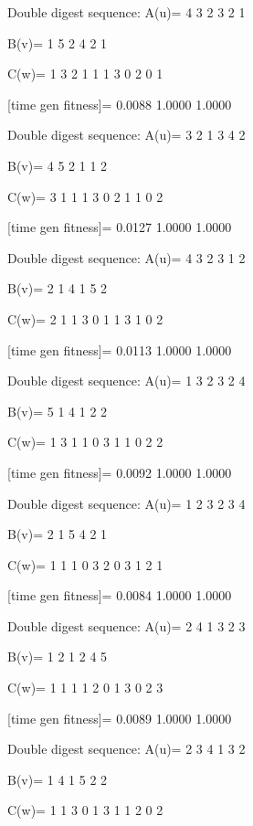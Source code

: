 Double digest sequence:
A(u)=
     4     3     2     3     2     1

B(v)=
     1     5     2     4     2     1

C(w)=
     1     3     2     1     1     1     3     0     2     0     1

[time gen fitness]=
    0.0088    1.0000    1.0000

Double digest sequence:
A(u)=
     3     2     1     3     4     2

B(v)=
     4     5     2     1     1     2

C(w)=
     3     1     1     1     3     0     2     1     1     0     2

[time gen fitness]=
    0.0127    1.0000    1.0000

Double digest sequence:
A(u)=
     4     3     2     3     1     2

B(v)=
     2     1     4     1     5     2

C(w)=
     2     1     1     3     0     1     1     3     1     0     2

[time gen fitness]=
    0.0113    1.0000    1.0000

Double digest sequence:
A(u)=
     1     3     2     3     2     4

B(v)=
     5     1     4     1     2     2

C(w)=
     1     3     1     1     0     3     1     1     0     2     2

[time gen fitness]=
    0.0092    1.0000    1.0000

Double digest sequence:
A(u)=
     1     2     3     2     3     4

B(v)=
     2     1     5     4     2     1

C(w)=
     1     1     1     0     3     2     0     3     1     2     1

[time gen fitness]=
    0.0084    1.0000    1.0000

Double digest sequence:
A(u)=
     2     4     1     3     2     3

B(v)=
     1     2     1     2     4     5

C(w)=
     1     1     1     1     2     0     1     3     0     2     3

[time gen fitness]=
    0.0089    1.0000    1.0000

Double digest sequence:
A(u)=
     2     3     4     1     3     2

B(v)=
     1     4     1     5     2     2

C(w)=
     1     1     3     0     1     3     1     1     2     0     2

